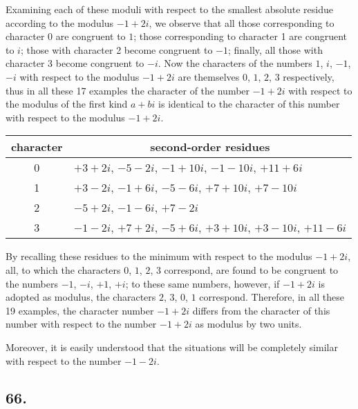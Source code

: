 \documentclass[twoside,12pt, showframe]{memoir}
\begin{document}
Examining each of these moduli with respect to the smallest absolute residue according to the modulus \(-1+2 i\), we observe that all those corresponding to character 0 are congruent to \(1\); those corresponding to character 1 are congruent to \(i\); those with character 2 become congruent to \(-1\); finally, all those with character 3 become congruent to \(-i\). Now the characters of the numbers \(1\), \( i\), \(-1\), \(-i\) with respect to the modulus \(-1+2 i\) are themselves \(0\), \(1\), \(2\), \(3\) respectively, thus in all these 17 examples the character of the number \(-1+2 i\) with respect to the modulus of the first kind \(a+b i\) is identical to the character of this number with respect to the modulus \(-1+2 i\).
%

\begin{center}
\begin{tabular}{c|l}
character & \multicolumn{1}{c}{second-order residues} \\
\hline
0 & \(+3+2 i\), \(-5-2 i\), \(-1+10 i\), \(-1-10 i\), \(+11+6 i\) \\
1 & \(+3-2 i\), \(-1+6 i\), \(-5-6 i\), \(+7+10 i\), \(+7-10 i\) \\
2 & \(-5+2 i\), \(-1-6 i\), \(+7-2 i\) \\
3 & \(-1-2 i\), \(+7+2 i\), \(-5+6 i\), \(+3+10 i\), \(+3-10 i\), \(+11-6 i\) \\
\end{tabular}
\end{center}
 
By recalling these residues to the minimum with respect to the modulus \(-1+2 i\), all, to which the characters \(0\), \(1\), \(2\), \(3\) correspond, are found to be congruent to the numbers \(-1\), \(-i\), \(+1\), \(+i\); to these same numbers, however, if \(-1+2 i\) is adopted as modulus, the characters \(2\), \(3\), \(0\), \(1\) correspond. Therefore, in all these 19 examples, the character number \(-1+2 i\) differs from the character of this number with respect to the number \(-1+2 i\) as modulus by two units.
 
Moreover, it is easily understood that the situations will be completely similar with respect to the number \(-1-2 i\).
%

\subsection*{66.}
\end{document}
